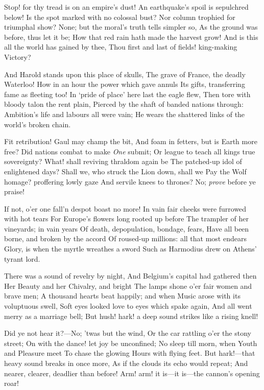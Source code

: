 \documentclass[10pt,twocolumn]{book}
\begin{document}
   Stop! for thy tread is on an empire's dust!
   An earthquake's spoil is sepulchred below!
   Is the spot marked with no colossal bust?
   Nor column trophied for triumphal show?
   None; but the moral's truth tells simpler so,
   As the ground was before, thus let it be;\textemdash
   How that red rain hath made the harvest grow!
   And is this all the world has gained by thee,
Thou first and last of fields! king-making Victory?


   And Harold stands upon this place of skulls,
   The grave of France, the deadly Waterloo!
   How in an hour the power which gave annuls
   Its gifts, transferring fame as fleeting too!
   In `pride of place' here last the eagle flew,
   Then tore with bloody talon the rent plain,
   Pierced by the shaft of banded nations through:
   Ambition's life and labours all were vain;
He wears the shattered links of the world's broken chain.


   Fit retribution!  Gaul may champ the bit,
   And foam in fetters, but is Earth more free?
   Did nations combat to make \textit{One} submit;
   Or league to teach all kings true sovereignty?
   What! shall reviving thraldom again be
   The patched-up idol of enlightened days?
   Shall we, who struck the Lion down, shall we
   Pay the Wolf homage? proffering lowly gaze
And servile knees to thrones?  No; \textit{prove} before ye praise!


   If not, o'er one fall'n despot boast no more!
   In vain fair cheeks were furrowed with hot tears
   For Europe's flowers long rooted up before
   The trampler of her vineyards; in vain years
   Of death, depopulation, bondage, fears,
   Have all been borne, and broken by the accord
   Of roused-up millions:  all that most endears
   Glory, is when the myrtle wreathes a sword
Such as Harmodius drew on Athens' tyrant lord.


   There was a sound of revelry by night,
   And Belgium's capital had gathered then
   Her Beauty and her Chivalry, and bright
   The lamps shone o'er fair women and brave men;
   A thousand hearts beat happily; and when
   Music arose with its voluptuous swell,
   Soft eyes looked love to eyes which spake again,
   And all went merry as a marriage bell;
But hush! hark! a deep sound strikes like a rising knell!


   Did ye not hear it?---No; 'twas but the wind,
   Or the car rattling o'er the stony street;
   On with the dance! let joy be unconfined;
   No sleep till morn, when Youth and Pleasure meet
   To chase the glowing Hours with flying feet.
   But hark!---that heavy sound breaks in once more,
   As if the clouds its echo would repeat;
   And nearer, clearer, deadlier than before!
Arm! arm! it is---it is---the cannon's opening roar!
\end{document}
